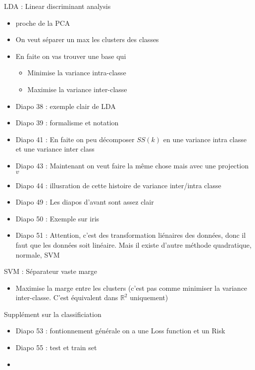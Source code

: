 \documentclass{article}
\theoremstyle{plain}%
\theoremstyle{definition}
\theoremstyle{remark}
\begin{document}
LDA : Linear discriminant analysis 
\begin{itemize}
    \item proche de la PCA 
    \item On veut séparer un max les clusters des classes 
    \item En faite on vas trouver une base qui \begin{itemize}
        \item Minimise la variance intra-classe
        \item Maximise la variance inter-classe
    \end{itemize}
    \item Diapo 38 : exemple clair de LDA
    \item Diapo 39 : formalisme et notation
    \item Diapo 41 : En faite on peu décomposer $ SS(k) $ en une variance intra classe et une variance inter class
    \item Diapo 43 : Maintenant on veut faire la même chose mais avec une projection $ v $ 
    \item Diapo 44 : illusration de cette histoire de variance inter/intra classe 
    \item Diapo 49 : Les diapos d'avant sont assez clair
    \item Diapo 50 : Exemple sur iris
    \item Diapo 51 : Attention, c'est des transformation liénaires des données, donc il faut que les données soit linéaire. Mais il existe d'autre méthode quadratique, normale, SVM
\end{itemize}
SVM : Séparateur vaste marge 
\begin{itemize}
    \item Maximise la marge entre les clusters (c'est pas comme minimiser la variance inter-classe. C'est équivalent dans $ \mathbb{R}^2 $ uniquement)
\end{itemize}
Supplément sur la classificiation
\begin{itemize}
    \item Diapo 53 : fontionnement générale on a une Loss function et un Risk
    \item Diapo 55 : test et train set
    \item 
\end{itemize}
\end{document}
